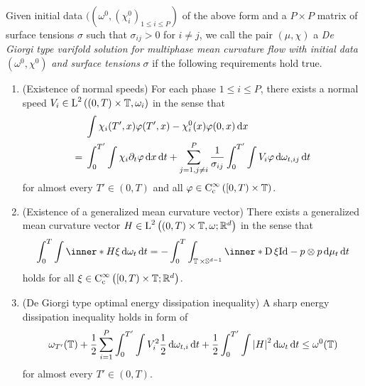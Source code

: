 \begin{definition}
	Given initial data 
	$ (
	( \omega^{ 0 },
	( \chi_{ i}^{ 0 } )_{ 1 \leq i \leq P}
	) $
	of the above form and a $ P \times P $ matrix of surface tensions $ \sigma 
	$ such that $ \sigma_{ i j } > 0 $ for $ i \neq j 
	$, we call the pair $ \left( \mu , \chi \right) $ a
	\emph{De Giorgi type varifold solution for multiphase mean curvature flow 
		with initial data} $ ( \omega^{ 0 } , \chi^{ 0 } ) $ \emph{and surface 
		tensions} $ \sigma $ if the following requirements hold true.
	\begin{enumerate}
		\item (Existence of normal speeds)
		For each phase $ 1 \leq i \leq P $, there exists a normal speed
		$ V_{ i } \in \operatorname{L}^{ 2 } \left(
		( 0 , T ) \times \operatorname{\mathbb{T}}, \omega_{ i } \right) $ in the sense 
		that
		\begin{align}
			\notag
			&
			\int
			\chi_{ i } ( T', x ) \varphi ( T', x ) 
			-
			\chi_{ i }^{ 0 } ( x ) \varphi ( 0 , x )
			\dd{ x }
			\\
			\label{equation_varifold_velocity_multiphase}
			={} &
			\int_{ 0 }^{ T' }
			\int
			\chi_{ i }
			\partial_{ t } \varphi
			\dd{ x }
			\dd{ t }
			+
			\sum_{ j =1, j \neq i  }^{ P }
			\frac{ 1 }{ \sigma_{ i j } }
			\int_{ 0 }^{ T' }
			\int
			V_{ i }
			\varphi
			\dd{ \omega_{ t , i j } }
			\dd{ t }
		\end{align}
		for almost every $ T' \in ( 0 , T ) $ and all $ \varphi \in \operatorname{C}_{ 
			\mathrm{c} }^{ \infty } \left( [ 0 , T ) \times \operatorname{\mathbb{T}}\right) 
		$.
		
		\item (Existence of a generalized mean curvature vector)
		There exists a generalized mean curvature vector 
		$ H \in \operatorname{L}^{ 2 } \left(
		( 0 , T )\times \operatorname{\mathbb{T}} , \omega; \mathbb{ R }^{ d } \right)
		$
		in the sense that
		\begin{equation}
			\label{equation_varifold_mean_curvature_multiphase}
			\int_{ 0 }^{ T }
			\int
			\inner*{ H }{ \xi }
			\dd{ \omega_{ t } }
			\dd{ t }
			=
			-
			\int_{ 0 }^{ T }
			\int_{ \flattorus \times \mathbb{ S }^{ d - 1 } }
			\inner*{ \diff \xi }
			{ \mathrm{Id} - p \otimes p }
			\dd{ \mu_{ t } }
			\dd{ t }
		\end{equation}
		holds for all $ \xi \in \operatorname{C}_{ 
			\mathrm{c} }^{ \infty } \left( [ 0 , T ) \times \operatorname{\mathbb{T}} ; 
			\mathbb{ 
			R }^{ d } \right) $.
		
		\item (De Giorgi type optimal energy dissipation inequality)
		A sharp energy dissipation inequality holds in form of
		\begin{equation}
			\label{equation_varifold_energy_dissipation_inequality}
			\omega_{ T' } ( \operatorname{\mathbb{T}} )
			+
			\frac{ 1 }{ 2 }
			\sum_{ i = 1 }^{ P }
			\int_{ 0 }^{ T' }
			\int
			V_{ i }^{ 2 }
			\frac{ 1 }{ 2 }
			\dd{ \omega_{ t , i } }
			\dd{ t }
			+
			\frac{ 1 }{ 2 }
			\int_{ 0 }^{ T' }
			\int
			\abs{ H }^{ 2 }
			\dd{ \omega_{ t } }
			\dd{ t }
			\leq
			\omega^{ 0 } ( \operatorname{\mathbb{T}} )
		\end{equation}
		for almost every $ T' \in ( 0 , T ) $.
		

\end{enumerate}
\end{definition}
